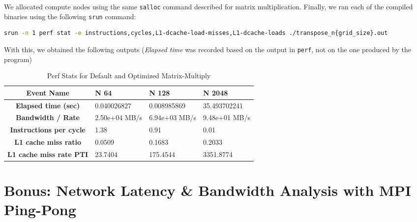\documentclass[a4paper,10pt]{article}
\begin{document}
We allocated compute nodes using the same \verb|salloc| command described for matrix multiplication. Finally, we ran each of the compiled binaries using the following \verb|srun| command: 
\begin{lstlisting}[language=bash,basicstyle=\tiny\ttfamily]
srun -n 1 perf stat -e instructions,cycles,L1-dcache-load-misses,L1-dcache-loads ./transpose_n{grid_size}.out
\end{lstlisting}
With this, we obtained the following outputs (\textit{Elapsed time} was recorded based on the output in \verb|perf|, not on the one produced by the program)
\begin{table}[h!]
\centering
\begin{tabular}{|c|p{2.5cm}|p{2.5cm}|p{2.5cm}|}
\hline
\textbf{Event Name} & \textbf{N 64} & \textbf{N 128} & \textbf{N 2048}  \\
\hline
\textbf{Elapsed time (sec)} & 0.040026827 & 0.008985869 & 35.493702241  \\
\hline
\textbf{Bandwidth / Rate} & 2.50e+04 MB/s & 6.94e+03 MB/s & 9.48e+01 MB/s \\
\hline
\textbf{Instructions per cycle} & 1.38 & 0.91 & 0.01 \\ 
\hline
\textbf{L1 cache miss ratio} & 0.0509 & 0.1683 & 0.2033 \\
\hline
\textbf{L1 cache miss rate PTI} & 23.7404 & 175.4544 & 3351.8774  \\
\hline
\end{tabular}
\caption{Perf Stats for Default and Optimized Matrix-Multiply}
\end{table}




\section{Bonus: Network Latency \& Bandwidth Analysis with MPI Ping-Pong}
\end{document}
